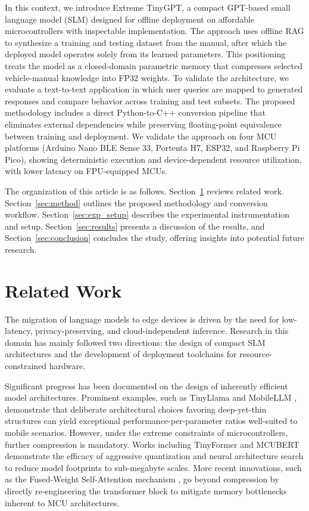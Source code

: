 \documentclass{ieeeaccess}
\begin{document}
In this context, we introduce Extreme TinyGPT, a compact GPT-based small language model (SLM) designed for offline deployment on affordable microcontrollers with inspectable implementation. The approach uses offline RAG to synthesize a training and testing dataset from the manual, after which the deployed model operates solely from its learned parameters. This positioning treats the model as a closed-domain parametric memory that compresses selected vehicle-manual knowledge into FP32 weights. To validate the architecture, we evaluate a text-to-text application in which user queries are mapped to generated responses and compare behavior across training and test subsets. The proposed methodology includes a direct Python-to-C++ conversion pipeline that eliminates external dependencies while preserving floating-point equivalence between training and deployment. We validate the approach on four MCU platforms (Arduino Nano BLE Sense 33, Portenta H7, ESP32, and Raspberry Pi Pico), showing deterministic execution and device-dependent resource utilization, with lower latency on FPU-equipped MCUs.




The organization of this article is as follows. Section~\ref{sec:related_works} reviews related work. Section~\ref{sec:method} outlines the proposed methodology and conversion workflow. Section~\ref{sec:exp_setup} describes the experimental instrumentation and setup. Section~\ref{sec:results} presents a discussion of the results, and Section~\ref{sec:conclusion} concludes the study, offering insights into potential future research.



\section{Related Work}\label{sec:related_works}

The migration of language models to edge devices is driven by the need for low-latency, privacy-preserving, and cloud-independent inference. Research in this domain has mainly followed two directions: the design of compact SLM architectures and the development of deployment toolchains for resource-constrained hardware.

Significant progress has been documented on the design of inherently efficient model architectures. Prominent examples, such as TinyLlama \cite{zhang2024tinyllama} and MobileLLM \cite{mobilellm2024}, demonstrate that deliberate architectural choices favoring deep-yet-thin structures can yield exceptional performance-per-parameter ratios well-suited to mobile scenarios. However, under the extreme constraints of microcontrollers, further compression is mandatory. Works including TinyFormer \cite{yang2023tinyformer} and MCUBERT \cite{10.1145/3676536.3676747} demonstrate the efficacy of aggressive quantization and neural architecture search to reduce model footprints to sub-megabyte scales. More recent innovations, such as the Fused-Weight Self-Attention mechanism \cite{JungOptimizing2025}, go beyond compression by directly re-engineering the transformer block to mitigate memory bottlenecks inherent to MCU architectures.
\end{document}
